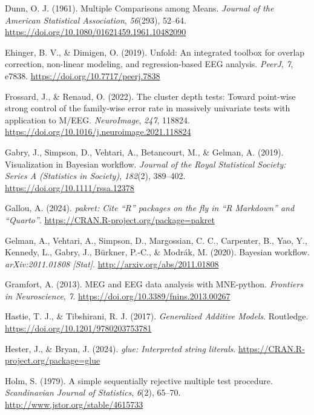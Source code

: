 \documentclass[
  doc,
  floatsintext,
  longtable,
  a4paper,
  nolmodern,
  notxfonts,
  notimes,
  donotrepeattitle,
  colorlinks=true,linkcolor=blue,citecolor=blue,urlcolor=blue]{apa7}
\newlength{\cslhangindent}
\newenvironment{CSLReferences}[2] %
 {\begin{list}{}{%
  \setlength{\itemindent}{0pt}
  \setlength{\leftmargin}{0pt}
  \setlength{\parsep}{0pt}
  \ifodd #1
   \setlength{\leftmargin}{\cslhangindent}
   \setlength{\itemindent}{-1\cslhangindent}
  \fi
  \setlength{\itemsep}{#2\baselineskip}}}
 {\end{list}}
\begin{document}
\begin{CSLReferences}{1}{0}
Dunn, O. J. (1961). Multiple Comparisons among Means. \emph{Journal of
the American Statistical Association}, \emph{56}(293), 52--64.
\url{https://doi.org/10.1080/01621459.1961.10482090}

Ehinger, B. V., \& Dimigen, O. (2019). Unfold: An integrated toolbox for
overlap correction, non-linear modeling, and regression-based {EEG}
analysis. \emph{PeerJ}, \emph{7}, e7838.
\url{https://doi.org/10.7717/peerj.7838}

Frossard, J., \& Renaud, O. (2022). The cluster depth tests: Toward
point-wise strong control of the family-wise error rate in massively
univariate tests with application to M/EEG. \emph{NeuroImage},
\emph{247}, 118824.
\url{https://doi.org/10.1016/j.neuroimage.2021.118824}

Gabry, J., Simpson, D., Vehtari, A., Betancourt, M., \& Gelman, A.
(2019). Visualization in Bayesian work{fl}ow. \emph{Journal of the Royal
Statistical Society: Series A (Statistics in Society)}, \emph{182}(2),
389--402. \url{https://doi.org/10.1111/rssa.12378}

Gallou, A. (2024). \emph{{pakret}: Cite {``{R}''} packages on the fly in
{``{R Markdown}''} and {``{Quarto}''}}.
\url{https://CRAN.R-project.org/package=pakret}

Gelman, A., Vehtari, A., Simpson, D., Margossian, C. C., Carpenter, B.,
Yao, Y., Kennedy, L., Gabry, J., Bürkner, P.-C., \& Modrák, M. (2020).
Bayesian workflow. \emph{arXiv:2011.01808 {[}Stat{]}}.
\url{http://arxiv.org/abs/2011.01808}

Gramfort, A. (2013). MEG and EEG data analysis with MNE-python.
\emph{Frontiers in Neuroscience}, \emph{7}.
\url{https://doi.org/10.3389/fnins.2013.00267}

Hastie, T. J., \& Tibshirani, R. J. (2017). \emph{Generalized Additive
Models}. Routledge. \url{https://doi.org/10.1201/9780203753781}

Hester, J., \& Bryan, J. (2024). \emph{{glue}: Interpreted string
literals}. \url{https://CRAN.R-project.org/package=glue}

Holm, S. (1979). A simple sequentially rejective multiple test
procedure. \emph{Scandinavian Journal of Statistics}, \emph{6}(2),
65--70. \url{http://www.jstor.org/stable/4615733}


\end{CSLReferences}
\end{document}
